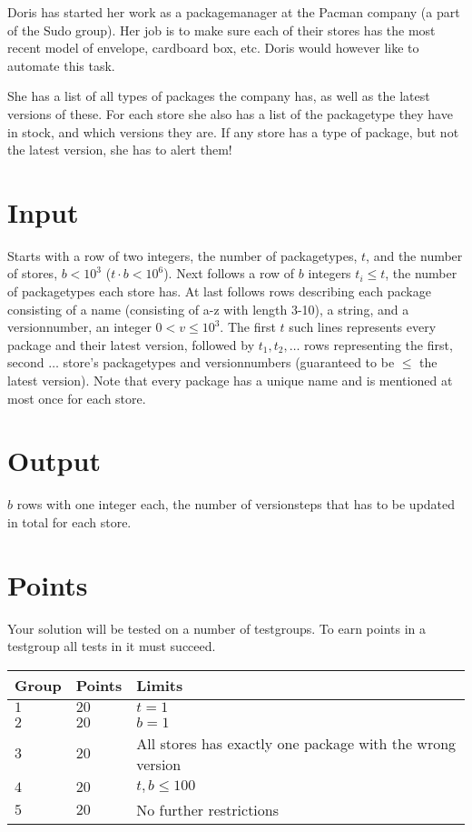 \noindent
Doris has started her work as a packagemanager at the Pacman company (a part of the Sudo group). Her job is to make sure each of their stores has the most recent model of envelope, cardboard box, etc. Doris would however like to automate this task.

\noindent
She has a list of all types of packages the company has, as well as the latest versions of these. For each store she also has a list of the packagetype they have in stock, and which versions they are. If any store has a type of package, but not the latest version, she has to alert them!

\section*{Input}
\noindent
Starts with a row of two integers, the number of packagetypes, $t$, and the number of stores, $b < 10^3$ ($t \cdot b < 10^6$). Next follows a row of $b$ integers $t_i \leq t$, the number of packagetypes each store has. At last follows rows describing each package consisting of a name (consisting of a-z with length 3-10), a string, and a versionnumber, an integer $0 < v \leq 10^3$. The first $t$ such lines represents every package and their latest version, followed by $t_1, t_2, \dots$ rows representing the first, second $\dots$ store's packagetypes and versionnumbers (guaranteed to be $\leq$ the latest version). Note that every package has a unique name and is mentioned at most once for each store.

\section*{Output}
\noindent
$b$ rows with one integer each, the number of versionsteps that has to be updated in total for each store.

\section*{Points}
\noindent
Your solution will be tested on a number of testgroups.
To earn points in a testgroup all tests in it must succeed.

\noindent
\begin{tabular}{| l | l | l |}
\hline
  Group & Points & Limits \\ \hline
  $1$    & $20$       &  $t = 1$ \\ \hline 
  $2$    & $20$       &  $b = 1$ \\ \hline
  $3$    & $20$       &  All stores has exactly one package with the wrong version \\ \hline
  $4$    & $20$       &  $t, b \leq 100$ \\ \hline
  $5$    & $20$       &  No further restrictions \\ \hline
\end{tabular}
